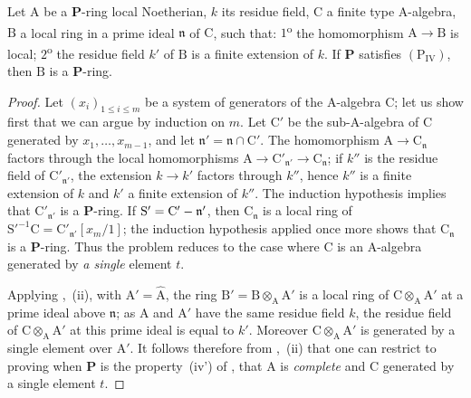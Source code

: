 \begin{lemma}[7.4.4.1]
\label{IV.7.4.4.1}
Let $\mathrm{A}$ be a $\boldsymbol{P}$-ring local Noetherian, $k$ its residue field, $\mathrm{C}$ a finite type A-algebra, $\mathrm{B}$ a local ring in a prime ideal $\mathfrak{n}$ of $\mathrm{C}$, such that:
$1$\textsuperscript{o} the homomorphism $\mathrm{A}\to\mathrm{B}$ is local; $2$\textsuperscript{o} the residue field $k'$ of $\mathrm{B}$ is a finite extension of $k$.
If $\boldsymbol{P}$ satisfies $(\mathrm{P_{IV}})$, then $\mathrm{B}$ is a $\boldsymbol{P}$-ring.
\end{lemma}

\begin{proof}
Let $(x_i)_{1\leqslant i\leqslant m}$ be a system of generators of the $\mathrm{A}$-algebra $\mathrm{C}$; let us show first that we can argue by induction on $m$.
Let $\mathrm{C}'$ be the sub-$\mathrm{A}$-algebra of $\mathrm{C}$ generated by $x_1,\ldots,x_{m-1}$, and let $\mathfrak{n}'=\mathfrak{n}\cap\mathrm{C}'$.
The homomorphism $\mathrm{A}\to\mathrm{C}_\mathfrak{n}$ factors through the local homomorphisms $\mathrm{A}\to\mathrm{C}'_{\mathfrak{n}'}\to\mathrm{C}_\mathfrak{n}$; if $k''$ is the residue field of $\mathrm{C}'_{\mathfrak{n}'}$, the extension $k\to k'$ factors through $k''$, hence $k''$ is a finite extension of $k$ and $k'$ a finite extension of $k''$.
The induction hypothesis implies that $\mathrm{C}'_{\mathfrak{n}'}$ is a $\boldsymbol{P}$-ring. If $\mathrm{S}'=\mathrm{C}'-\mathfrak{n}'$, then $\mathrm{C}_\mathfrak{n}$ is a local ring of $\mathrm{S}'^{-1}\mathrm{C}=\mathrm{C}'_{\mathfrak{n}'}[x_m/1]$; the induction hypothesis applied once more shows that $\mathrm{C}_\mathfrak{n}$ is a $\boldsymbol{P}$-ring. Thus the problem reduces to the case where $\mathrm{C}$ is an $\mathrm{A}$-algebra generated by \emph{a single} element $t$.

Applying ,~(ii), with $\mathrm{A}'=\widehat{\mathrm{A}}$, the ring $\mathrm{B}'=\mathrm{B}\otimes_\mathrm{A}\mathrm{A}'$ is a local ring of $\mathrm{C}\otimes_\mathrm{A}\mathrm{A}'$ at a prime ideal above $\mathfrak{n}$; as $\mathrm{A}$ and $\mathrm{A}'$ have the same residue field $k$, the residue field of $\mathrm{C}\otimes_\mathrm{A}\mathrm{A}'$ at this prime ideal is equal to $k'$.
Moreover $\mathrm{C}\otimes_\mathrm{A}\mathrm{A}'$ is generated by a single element over $\mathrm{A}'$.
It follows therefore from ,~(ii) that one can restrict to proving  when $\boldsymbol{P}$ is the property~(iv') of , that $\mathrm{A}$ is \emph{complete} and $\mathrm{C}$ generated by a single element $t$.


\end{proof}
